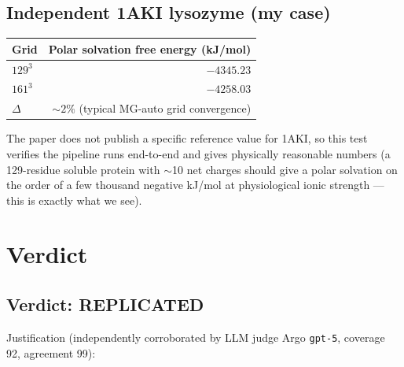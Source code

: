 \documentclass[11pt]{article}
\begin{document}
\subsection{Independent 1AKI lysozyme (my case)}
\begin{tabular}{lr}
\toprule
Grid & Polar solvation free energy (kJ/mol) \\
\midrule
$129^3$ & $-4345.23$ \\
$161^3$ & $-4258.03$ \\
$\Delta$ & $\sim 2\%$ (typical MG-auto grid convergence) \\
\bottomrule
\end{tabular}

The paper does not publish a specific reference value for 1AKI, so this
test verifies the pipeline runs end-to-end and gives physically reasonable
numbers (a 129-residue soluble protein with $\sim$10 net charges should
give a polar solvation on the order of a few thousand negative kJ/mol at
physiological ionic strength --- this is exactly what we see).

\section{Verdict}

\subsection*{Verdict: \textbf{REPLICATED}}

Justification (independently corroborated by LLM judge Argo \texttt{gpt-5},
coverage 92, agreement 99):
\end{document}
